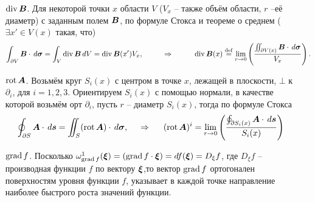 \begin{itemize}
    \item[$\mathop{\mathrm{div}}\nolimits \mbox{\boldmath $B$}$.] 
    Для некоторой точки $x$ области $V$ ($V_x$ -- также объём области, $r$ --её диаметр) с заданным полем $\mbox{\boldmath $B$}$, по формуле Стокса и теореме о среднем ($\exists x' \in V(x) $ такая, что)
\begin{equation*}
    \int_{\partial V} \mbox{\boldmath $B$} \cdot \, d \mbox{\boldmath $\sigma$} = 
    \int_V \mathop{\mathrm{div}}\nolimits \mbox{\boldmath $B$} \, d V = \mathop{\mathrm{div}}\nolimits \mbox{\boldmath $B$}(x')V_x,
    \hspace{1cm} \Rightarrow \hspace{1cm} 
    \mathop{\mathrm{div}}\nolimits \mbox{\boldmath $B$}(x) \overset{\mathrm{def}}{=} 
    \lim_{r \to 0} \left(\frac{
                \iint_{\partial V(x)} \mbox{\boldmath $B$} \cdot \, d \mbox{\boldmath $\sigma$}
            }{
                V_x
            }\right).
\end{equation*}
\item[$\mathop{\mathrm{rot}}\nolimits \mbox{\boldmath $A$}$.] 
    Возьмём круг $S_i (x)$ с центром в точке $x$, лежащей в плоскости, $\bot$ к $\partial_i$, для $i = 1, 2, 3$. Ориентируем $S_i(x)$ с помощью нормали, в качестве которой возьмём орт $\partial_i$, пусть $r$ -- диаметр $S_i(x)$, тогда по формуле Стокса
    \begin{equation*}
        \oint_{\partial S} \mbox{\boldmath $A$} \cdot \, d \mbox{\boldmath $s$} = \iint_S (\mathop{\mathrm{rot}}\nolimits \mbox{\boldmath $A$}) \cdot \, d \mbox{\boldmath $\sigma$},
        \hspace{0.5cm} \Rightarrow \hspace{0.5cm}   
        (\mathop{\mathrm{rot}}\nolimits \mbox{\boldmath $A$})^i = 
        \lim_{r \to 0}
        \left(
            \frac{
            \oint_{\partial S_i(x)} \mbox{\boldmath $A$} \cdot \, d \mbox{\boldmath $s$}
            }{
            S_i(x)
            } 
        \right)
    \end{equation*}
\item[$\mathop{\mathrm{grad}}\nolimits f$.] Посколько $\omega^1_{\mathop{\mathrm{grad}}\nolimits f} (\mbox{\boldmath $\xi$}) = (\mathop{\mathrm{grad}}\nolimits f \cdot \mbox{\boldmath $\xi$}) = d f(\mbox{\boldmath $\xi$}) = D_{{\xi}}f$, где $D_{{\xi}}f$ -- производная функции $f$ по вектору $\mbox{\boldmath $\xi$}$,то вектор $\mathop{\mathrm{grad}}\nolimits f$ ортогонален поверхностям уровня функции $f$, указывает в каждой точке направление наиболее быстрого роста значений функции.
\end{itemize}

